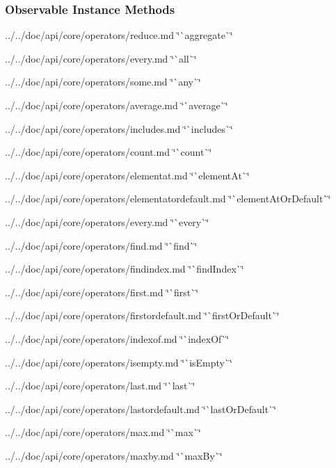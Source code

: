 \subsubsection*{{\ttfamily Observable Instance Methods}}


\begin{DoxyItemize}
\item ../../doc/api/core/operators/reduce.md \char`\"{}\`{}aggregate\`{}\char`\"{}
\item ../../doc/api/core/operators/every.md \char`\"{}\`{}all\`{}\char`\"{}
\item ../../doc/api/core/operators/some.md \char`\"{}\`{}any\`{}\char`\"{}
\item ../../doc/api/core/operators/average.md \char`\"{}\`{}average\`{}\char`\"{}
\item ../../doc/api/core/operators/includes.md \char`\"{}\`{}includes\`{}\char`\"{}
\item ../../doc/api/core/operators/count.md \char`\"{}\`{}count\`{}\char`\"{}
\item ../../doc/api/core/operators/elementat.md \char`\"{}\`{}element\+At\`{}\char`\"{}
\item ../../doc/api/core/operators/elementatordefault.md \char`\"{}\`{}element\+At\+Or\+Default\`{}\char`\"{}
\item ../../doc/api/core/operators/every.md \char`\"{}\`{}every\`{}\char`\"{}
\item ../../doc/api/core/operators/find.md \char`\"{}\`{}find\`{}\char`\"{}
\item ../../doc/api/core/operators/findindex.md \char`\"{}\`{}find\+Index\`{}\char`\"{}
\item ../../doc/api/core/operators/first.md \char`\"{}\`{}first\`{}\char`\"{}
\item ../../doc/api/core/operators/firstordefault.md \char`\"{}\`{}first\+Or\+Default\`{}\char`\"{}
\item ../../doc/api/core/operators/indexof.md \char`\"{}\`{}index\+Of\`{}\char`\"{}
\item ../../doc/api/core/operators/isempty.md \char`\"{}\`{}is\+Empty\`{}\char`\"{}
\item ../../doc/api/core/operators/last.md \char`\"{}\`{}last\`{}\char`\"{}
\item ../../doc/api/core/operators/lastordefault.md \char`\"{}\`{}last\+Or\+Default\`{}\char`\"{}
\item ../../doc/api/core/operators/max.md \char`\"{}\`{}max\`{}\char`\"{}
\item ../../doc/api/core/operators/maxby.md \char`\"{}\`{}max\+By\`{}\char`\"{}

\end{DoxyItemize}
